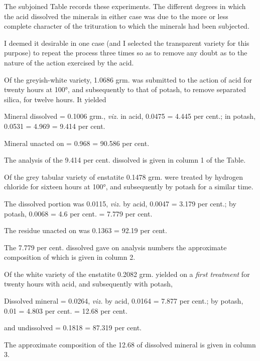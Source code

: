 \documentclass[a4paper, 12pt, oneside]{article}
\begin{document}
The subjoined Table records these experiments. The different degrees in which the acid dissolved the minerals in either case was due to the more or less complete character of the trituration to which the minerals had been subjected.

I deemed it desirable in one case (and I selected the transparent variety for this purpose) to repeat the process three times so as to remove any doubt as to the nature of the action exercised by the acid.

Of the greyish-white variety, 1.0686 grm. was submitted to the action of acid for twenty hours at 100°, and subsequently to that of potash, to remove separated silica, for twelve hours. It yielded

\bigskip

Mineral dissolved = 0.1006 grm., \emph{viz.} {in acid, 0.0475 = 4.445 per cent.; in potash, 0.0531 = 4.969} = 9.414 per cent.

Mineral unacted on = 0.968 = 90.586 per cent. 

\bigskip

The analysis of the 9.414 per cent. dissolved is given in column 1 of the Table.

Of the grey tabular variety of enstatite 0.1478 grm. were treated by hydrogen chloride for sixteen hours at 100°, and subsequently by potash for a similar time.

\bigskip

The dissolved portion was 0.0115, \emph{viz.} {by acid, 0.0047 = 3.179 per cent.; by potash, 0.0068 = 4.6 per cent.} = 7.779 per cent.

The residue unacted on was 0.1363 = 92.19 per cent.

\bigskip

The 7.779 per cent. dissolved gave on analysis numbers the approximate composition of which is given in column 2.

Of the white variety of the enstatite 0.2082 grm. yielded on a \emph{first treatment} for twenty hours with acid, and subsequently with potash,

\bigskip

Dissolved mineral = 0.0264, \emph{viz.} {by acid, 0.0164 = 7.877 per cent.; by potash, 0.01 = 4.803 per cent.} = 12.68 per cent.

and undissolved = 0.1818 = 87.319 per cent.

\bigskip

The approximate composition of the 12.68 of dissolved mineral is given in column 3.
\end{document}
